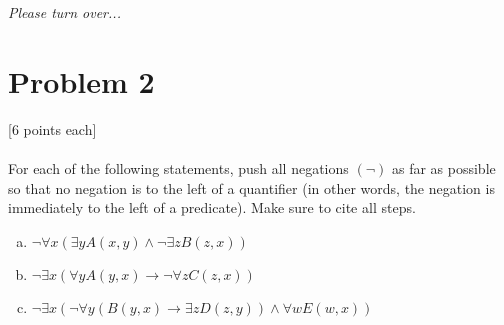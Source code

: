 \documentclass[answers]{exam}
\newcommand{\pte}[1]{\vspace{-0.8em}\textcolor{myDColor}{[#1 points each]} \\\\}
\newenvironment{problem}[1][Problem]{\section*{\textcolor{myLColor}{#1}}}{\vspace{0.2em}}
\newcommand{\pto}{
\begin{flushright}
    \textit{\textcolor{myDColor}{Please turn over...}}
\end{flushright}\pagebreak}
\begin{document}
\pto

\begin{problem}[Problem 2]
    \pte{6} 
    \noindent For each of the following statements, push all negations $(\neg)$ as far as possible so that no negation is to the left of a quantifier (in other words, the negation is immediately to the left of a predicate). Make sure to cite all steps.
    \begin{enumerate}[(a)]
        \item $\neg \forall x (\exists y A(x,y) \land \neg \exists z B(z,x))$ 
        \item $\neg \exists x (\forall y A(y,x) \rightarrow \neg \forall z C(z,x))$
        \item $\neg \exists x (\neg \forall y (B(y,x) \rightarrow \exists z D(z,y)) \land \forall w E(w,x))$
    \end{enumerate}
\end{problem}
\end{document}
